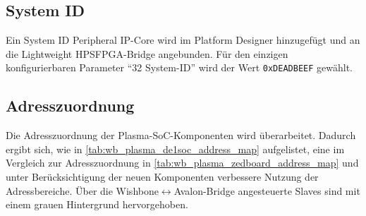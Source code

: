 \subsection{System ID}

Ein System ID Peripheral IP-Core wird im Platform Designer hinzugefügt und an die Lightweight \gls{HPS}\textrightarrow{}\gls{FPGA}-Bridge angebunden. Für den einzigen konfigurierbaren Parameter \enquote{\SI{32}{\bit} System-ID} wird der Wert \texttt{0xDEADBEEF} gewählt.

%

\subsection{Adresszuordnung}

Die Adresszuordnung der Plasma-\gls{SoC}-Komponenten wird überarbeitet. Dadurch ergibt sich, wie in \cref{tab:wb_plasma_de1soc_address_map} aufgelistet, eine im Vergleich zur Adresszuordnung in \cref{tab:wb_plasma_zedboard_address_map} und unter Berücksichtigung der neuen Komponenten verbessere Nutzung der Adressbereiche. Über die Wishbone{$\leftrightarrow$}Avalon-\gls{Bridge} angesteuerte Slaves sind mit einem grauen Hintergrund hervorgehoben.


